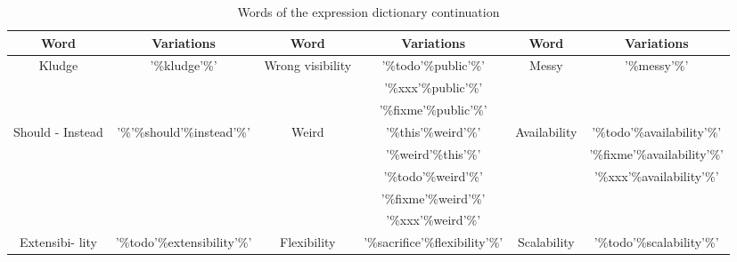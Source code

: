 \begin{table*}
	\begin{center}
		\caption{Words of the expression dictionary continuation }
		\label{tab:dictionaryExpressionWords2}
		\begin{tabular}{ |c|c|c|c|c|c| }
			\hline
			Word                                      &           Variations            &             Word             &     Variations     &             Word             &        Variations        \\ \hline
			
			\multirow{3}{4em}{Kludge}                 &       '\%kludge'\%'        & \multirow{3}{5em}{Wrong visibility} & '\%todo'\%public'\%'  & \multirow{3}{5em}{Messy} & '\%messy'\%' \\
			
			&           &                              & '\%xxx'\%public'\%'      &                           &   \\
			&           &                              & '\%fixme'\%public'\%'   &                              &  \\				
			
			
			\hline									 		                           
			
			
			\multirow{5}{4em}{Should - Instead}                 &       '\%'\%should'\%instead'\%'        & \multirow{5}{5em}{Weird} & '\%this'\%weird'\%'  & \multirow{5}{5em}{Availability} & '\%todo'\%availability'\%'   \\
			
			&           &                              & '\%weird'\%this'\%'     &                           &   '\%fixme'\%availability'\%'\\
			&           &                              & '\%todo'\%weird'\%'   &                              &  '\%xxx'\%availability'\%'\\				
			&           &                              & '\%fixme'\%weird'\%'   &                              &  \\				
			&           &                              & '\%xxx'\%weird'\%'   &                              &  \\				
			
			
			\hline									 		                                    				
			
			
			\multirow{4}{4em}{Extensibi- lity}                 &       '\%todo'\%extensibility'\%'        & \multirow{4}{5em}{Flexibility} & '\%sacrifice'\%flexibility'\%'   & \multirow{4}{5em}{Scalability} & '\%todo'\%scalability'\%'   \\
			

\end{tabular}
\end{center}
\end{table*}
